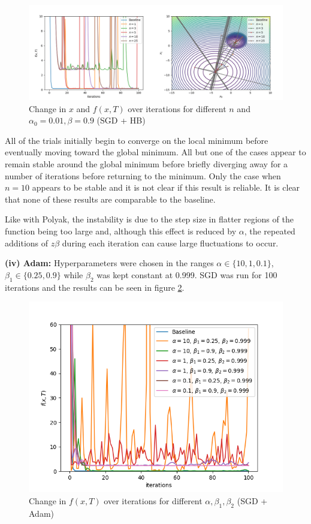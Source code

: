 \documentclass[12pt]{article}
\begin{document}
\begin{figure}[h]
    \hspace*{-0.45in}
    \includegraphics[scale=1.75]{figs/c/c_iii.png}
    \caption{Change in $x$ and $f(x, T)$ over iterations for different $n$ and $\alpha_0=0.01,\beta=0.9$ (SGD + HB)}
    \label{fig:c_iii}
\end{figure}

All of the trials initially begin to converge on the local minimum before eventually moving toward the global minimum. All but one of the cases appear to remain stable around the global minimum before briefly diverging away for a number of iterations before returning to the minimum. Only the case when $n=10$ appears to be stable and it is not clear if this result is reliable. It is clear that none of these results are comparable to the baseline.

Like with Polyak, the instability is due to the step size in flatter regions of the function being too large and, although this effect is reduced by $\alpha$, the repeated additions of $z\beta$ during each iteration can cause large fluctuations to occur.

\vspace{3mm}
\noindent \textbf{(iv) Adam:} Hyperparameters were chosen in the ranges $\alpha \in \{10,1,0.1\}$, $\beta_1 \in \{0.25,0.9\}$ while $\beta_2$ was kept constant at 0.999. SGD was run for 100 iterations and the results can be seen in figure \ref{fig:c_iv_params}.

\begin{figure}[h]
    \centering
    \includegraphics[scale=0.6]{figs/c/c_iv_params.png}
    \caption{Change in $f(x, T)$ over iterations for different $\alpha,\beta_1,\beta_2$ (SGD + Adam)}
    \label{fig:c_iv_params}
\end{figure}
\end{document}
